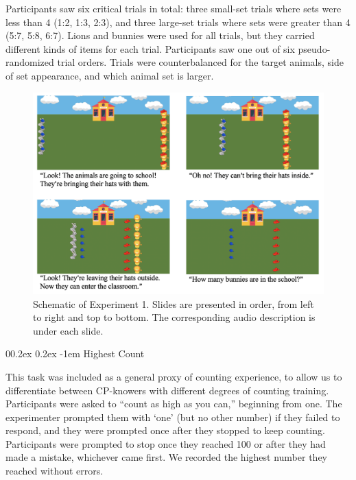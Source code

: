 \documentclass[
  man,floatsintext]{apa7}
\makeatletter
\let\oldparagraph\paragraph
\renewcommand{\paragraph}{
    \@ifstar
      \xxxParagraphStar
      \xxxParagraphNoStar
  }
\newcommand{\xxxParagraphStar}[1]{\oldparagraph*{#1}\mbox{}}
\newcommand{\xxxParagraphNoStar}[1]{\oldparagraph{#1}\mbox{}}
\renewcommand{\paragraph}{\@startsection{paragraph}{4}{\parindent}%
  {0\baselineskip \@plus 0.2ex \@minus 0.2ex}%
  {-1em}%
  {\normalfont\normalsize\bfseries\itshape\typesectitle}}
\renewcommand{\paragraph}{\@startsection{paragraph}{4}{\parindent}%
  {0\baselineskip \@plus 0.2ex \@minus 0.2ex}%
  {-1em}%
  {\normalfont\normalsize\bfseries\typesectitle}}
\makeatother
\begin{document}
Participants saw six critical trials in total: three small-set trials where sets were less than 4 (1:2, 1:3, 2:3), and three large-set trials where sets were greater than 4 (5:7, 5:8, 6:7). Lions and bunnies were used for all trials, but they carried different kinds of items for each trial. Participants saw one out of six pseudo-randomized trial orders. Trials were counterbalanced for the target animals, side of set appearance, and which animal set is larger.

\begin{figure}[h]

{\centering \includegraphics[width=1\linewidth]{figs/exp1} 

}

\caption{Schematic of Experiment 1. Slides are presented in order, from left to right and top to bottom. The corresponding audio description is under each slide.}\label{fig:exp1-figure}
\end{figure}

\paragraph{Highest Count}\label{highest-count}

This task was included as a general proxy of counting experience, to allow us to differentiate between CP-knowers with different degrees of counting training. Participants were asked to ``count as high as you can,'' beginning from one. The experimenter prompted them with `one' (but no other number) if they failed to respond, and they were prompted once after they stopped to keep counting. Participants were prompted to stop once they reached 100 or after they had made a mistake, whichever came first. We recorded the highest number they reached without errors.
\end{document}
